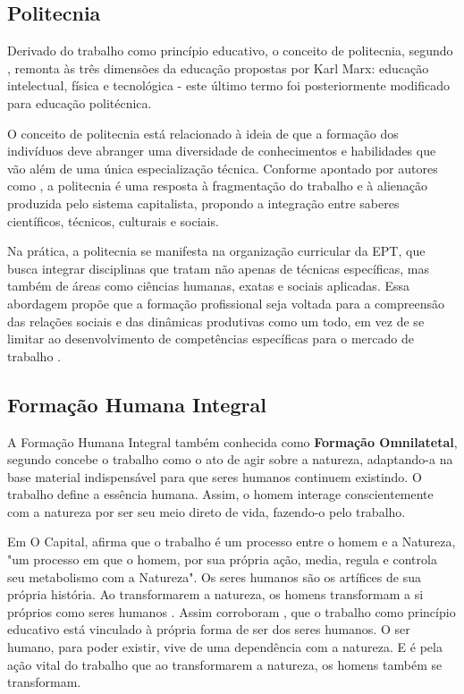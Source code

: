 \subsection{Politecnia}
\label{politecnia}

Derivado do trabalho como princípio educativo, o conceito de politecnia, segundo , remonta às três dimensões da educação propostas por Karl Marx: educação intelectual, física e tecnológica - este último termo foi posteriormente modificado para educação politécnica.

O conceito de politecnia está relacionado à ideia de que a formação dos indivíduos deve abranger uma diversidade de conhecimentos e habilidades que vão além de uma única especialização técnica. Conforme apontado por autores como , a politecnia é uma resposta à fragmentação do trabalho e à alienação produzida pelo sistema capitalista, propondo a integração entre saberes científicos, técnicos, culturais e sociais.

Na prática, a politecnia se manifesta na organização curricular da EPT, que busca integrar disciplinas que tratam não apenas de técnicas específicas, mas também de áreas como ciências humanas, exatas e sociais aplicadas. Essa abordagem propõe que a formação profissional seja voltada para a compreensão das relações sociais e das dinâmicas produtivas como um todo, em vez de se limitar ao desenvolvimento de competências específicas para o mercado de trabalho \cite{ciavatta2005formaccao}.



\subsection{Formação Humana Integral}

A Formação Humana Integral também conhecida como \textbf{Formação Omnilatetal}, segundo  concebe o trabalho como o ato de agir sobre a natureza, adaptando-a na base material indispensável para que seres humanos continuem existindo. O trabalho define a essência humana. Assim, o homem interage conscientemente com a natureza por ser seu meio direto de vida, fazendo-o pelo trabalho.

Em O Capital,  afirma que o trabalho é um processo entre o homem e a Natureza, "um processo em que o homem, por sua própria ação, media, regula e controla seu metabolismo com a Natureza". Os seres humanos são os artífices de sua própria história. Ao transformarem a natureza, os homens transformam a si próprios como seres humanos \cite{marx1984ideologia}. Assim corroboram , que o trabalho como princípio educativo está vinculado à própria forma de ser dos seres humanos. O ser humano, para poder existir, vive de uma dependência com a natureza. E é pela ação vital do trabalho que ao transformarem a natureza, os homens também se transformam.




